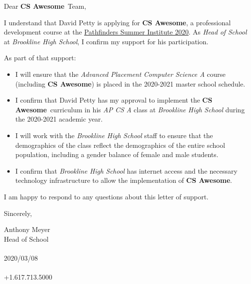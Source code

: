 \documentclass[11pt]{article}%
\def\docdate{2020/03/08}%
\def\docphone{+1.617.713.5000}%
\def\docfrom{Anthony Meyer}
\def\doctitle{Head of School}
\def\csawesome{\textbf{CS Awesome}}
\begin{document}
\begin{multicols}{2}
Dear \csawesome\ Team,

I understand that David Petty is applying for \csawesome, a professional development course at the \href{https://www.csawesome.org/pathfinders}{Pathfinders Summer Institute 2020}. As \textit{Head of School} at \textit{Brookline High School}, I confirm my support for his participation.

As part of that support:\begin{itemize}
\item I will ensure that the \textit{Advanced Placement Computer Science A} course (including \csawesome) is placed in the 2020-2021 master school schedule. 
\item I confirm that David Petty has my approval to implement the \csawesome\ curriculum in his \textit{AP CS A} class at \textit{Brookline High School} during the 2020-2021 academic year.
\item I will work with the \textit{Brookline High School} staff to ensure that the demographics of the class reflect the demographics of the entire school population, including a gender balance of female and male students.
\item I confirm that \textit{Brookline High School} has internet access and the necessary technology infrastructure to allow the implementation of \csawesome.
\end{itemize}
I am happy to respond to any questions about this letter of support.
\end{multicols}

\begin{paracol}{2}\switchcolumn
Sincerely,\vspace{9ex}

 \docfrom \\
 \doctitle \\
 \docschool \\
 \docdate \\
 \linkemail \\
 \docphone \vspace{3ex}

\end{paracol}
\end{document}
